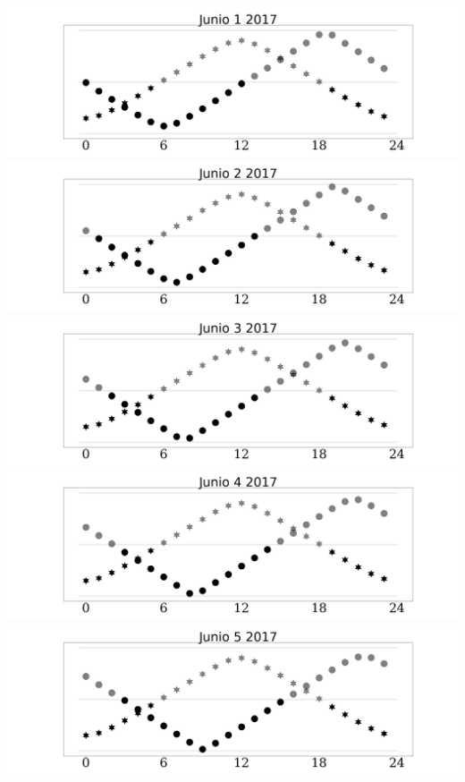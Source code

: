 \documentclass{report}
\begin{document}
\includegraphics[width=1.00\textwidth]{Junio_1_2017.png}\newpage
\includegraphics[width=1.00\textwidth]{Junio_2_2017.png}\newpage
\includegraphics[width=1.00\textwidth]{Junio_3_2017.png}\newpage
\includegraphics[width=1.00\textwidth]{Junio_4_2017.png}\newpage
\includegraphics[width=1.00\textwidth]{Junio_5_2017.png}\newpage
\end{document}
